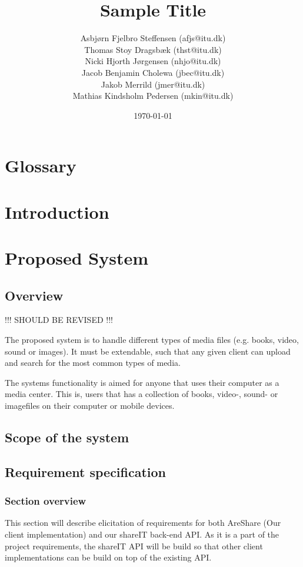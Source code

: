 \documentclass{report}
\title{Sample Title}
\date{\today}
\author{Asbj\o rn Fjelbro Steffensen (afjs@itu.dk)\\ Thomas Stoy Dragsb\ae k (thst@itu.dk)\\ Nicki Hjorth J\o rgensen (nhjo@itu.dk)\\ Jacob Benjamin Cholewa (jbec@itu.dk)\\ Jakob Merrild (jmer@itu.dk)\\ Mathias Kindsholm Pedersen (mkin@itu.dk)}
\begin{document}

\newpage
\tableofcontents

\chapter{Glossary}


\chapter{Introduction}


\newpage


\chapter{Proposed System}

\section{Overview}

!!! SHOULD BE REVISED !!!

The proposed system is to handle different types of media files (e.g. books, video, sound or images). It must be extendable, such that any given client can upload and search for the most common types of media.

The systems functionality is aimed for anyone that uses their computer as a media center. This is, users that has a collection of books, video-, sound- or imagefiles on their computer or mobile devices.

\section{Scope of the system}


\section{Requirement specification}
\subsection{Section overview}
This section will describe elicitation of requirements for both AreShare (Our client implementation) and our shareIT back-end API. As it is a part of the project requirements, the shareIT API will be build so that other client implementations can be build on top of the existing API.
\end{document}
